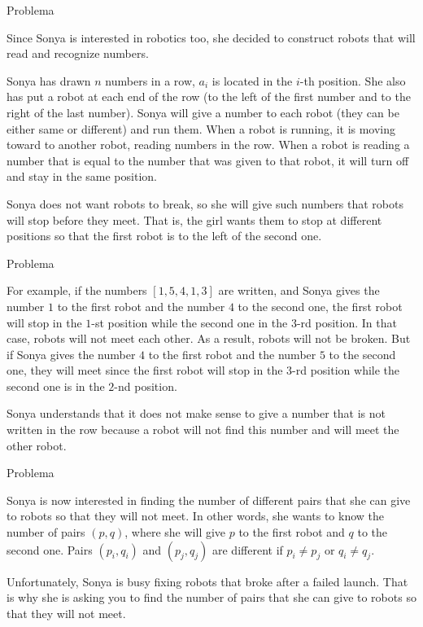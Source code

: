 
\begin{frame}[fragile]{Problema}

Since Sonya is interested in robotics too, she decided to construct robots that will read and recognize numbers.

Sonya has drawn $n$ numbers in a row, $a_i$ is located in the $i$-th position. 
She also has put a robot at each end of the row (to the left of the first number and to the right of the last number). Sonya will give a number to each robot (they can be either same or different) and run them. When a robot is running, it is moving toward to another robot, reading numbers in the row. When a robot is reading a number that is equal to the number that was given to that robot, it will turn off and stay in the same position.

Sonya does not want robots to break, so she will give such numbers that robots will stop before they meet. That is, the girl wants them to stop at different positions so that the first robot is to the left of the second one.

\end{frame}


\begin{frame}[fragile]{Problema}

For example, if the numbers $[1,5,4,1,3]$ are written, and Sonya gives the number $1$ to the first 
robot and the number $4$ to the second one, the first robot will stop in the $1$-st position while the second one in the $3$-rd position. In that case, robots will not meet each other. As a result, robots will not be broken. But if Sonya gives the number $4$ to the first robot and the number $5$ to the second one, they will meet since the first robot will stop in the $3$-rd position while the second one is in the $2$-nd position.

Sonya understands that it does not make sense to give a number that is not written in the row because a robot will not find this number and will meet the other robot.

\end{frame}

\begin{frame}[fragile]{Problema}

Sonya is now interested in finding the number of different pairs that she can give to robots so that they will not meet. In other words, she wants to know the number of pairs $(p, q)$, where she 
will give $p$ to the first robot and $q$ to the second one. Pairs $(p_i, q_i)$ and $(p_j, q_j)$ 
are different if $p_i\neq p_j$ or $q_i\neq q_j$.

Unfortunately, Sonya is busy fixing robots that broke after a failed launch. That is why she is asking you to find the number of pairs that she can give to robots so that they will not meet.

\end{frame}

